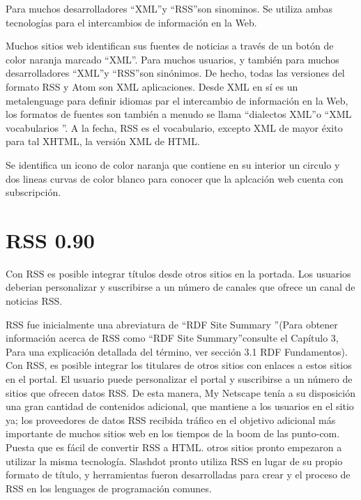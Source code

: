 Para muchos desarrolladores \textquotedblleft XML\textquotedblright y \textquotedblleft RSS\textquotedblright son sinominos. Se utiliza ambas tecnolog\'{i}as para el intercambios de informaci\'{o}n
en la Web.

Muchos sitios web identifican sus fuentes de noticias a trav\'{e}s de un bot\'{o}n de color naranja marcado \textquotedblleft XML\textquotedblright. Para muchos usuarios, y tambi\'{e}n para muchos desarrolladores \textquotedblleft XML\textquotedblright  y \textquotedblleft RSS\textquotedblright son sin\'{o}nimos. De hecho, todas las versiones del formato RSS y Atom son XML aplicaciones. Desde XML en s\'{i} es un metalenguage para definir idiomas par el intercambio de informaci\'{o}n en la
Web, los formatos de fuentes son tambi\'{e}n a menudo se llama \textquotedblleft dialectos XML\textquotedblright  o \textquotedblleft XML vocabularios \textquotedblright. A la fecha, RSS es el vocabulario, 
excepto XML de mayor \'{e}xito para tal XHTML, la versi\'{o}n XML de HTML.\cite{wittenbrink2005rss}

Se identifica un icono de color naranja que contiene en su interior un circulo y dos lineas curvas de color blanco para conocer
que la aplcaci\'{o}n web cuenta con subscripci\'{o}n.

\section{RSS 0.90}

Con RSS es posible integrar t\'{i}tulos desde otros sitios en la portada. Los usuarios deberian personalizar y suscribirse 
a un n\'{u}mero de canales que ofrece un canal de noticias RSS.


RSS fue inicialmente una abreviatura de \textquotedblleft RDF Site Summary \textquotedblright (Para obtener informaci\'{o}n acerca de RSS como
\textquotedblleft RDF Site Summary\textquotedblright consulte el Cap\'{i}tulo 3, Para una explicaci\'{o}n detallada del t\'{e}rmino, ver secci\'{o}n
3.1 RDF Fundamentos). Con RSS, es posible integrar los titulares de otros sitios con enlaces a estos sitios en el 
portal. El usuario puede personalizar el portal y suscribirse a un n\'{u}mero de sitios que ofrecen datos RSS.
De esta manera, My Netscape ten\'{i}a a su disposici\'{o}n una gran cantidad de contenidos adicional, que mantiene
a los usuarios en el sitio ya; los proveedores de datos RSS recibida tr\'{a}fico en el objetivo adicional m\'{a}s
importante de muchos sitios web en los tiempos de la boom de las punto-com. Puesta que es f\'{a}cil de convertir 
RSS a HTML. otros sitios pronto empezaron a utilizar la misma tecnolog\'{i}a. Slashdot pronto utiliza RSS en lugar
de su propio formato de t\'{i}tulo, y herramientas fueron desarrolladas para crear y el proceso de RSS en los 
lenguages de programaci\'{o}n comunes.\cite{wittenbrink2005rss}


